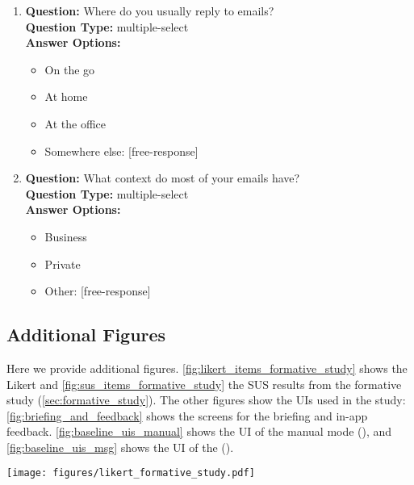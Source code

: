\begin{enumerate}
\item
  \textbf{Question:} Where do you usually reply to emails? \\
  \textbf{Question Type:} multiple-select \\
  \textbf{Answer Options:}
  \begin{itemize}
    \item On the go
    \item At home
    \item At the office
    \item Somewhere else: [free-response]
  \end{itemize}

\item
  \textbf{Question:} What context do most of your emails have? \\
  \textbf{Question Type:} multiple-select \\
  \textbf{Answer Options:}
  \begin{itemize}
    \item Business
    \item Private
    \item Other: [free-response]
  \end{itemize}

\end{enumerate}






\subsection{Additional Figures}\label{sec:appendix_extra_figures}
Here we provide additional figures.
\cref{fig:likert_items_formative_study} shows the Likert and \cref{fig:sus_items_formative_study} the SUS \cite{brooke1996sus} results from the formative study (\cref{sec:formative_study}).
The other figures show the UIs used in the study: \cref{fig:briefing_and_feedback} shows the screens for the briefing and in-app feedback. \cref{fig:baseline_uis_manual} shows the UI of the manual mode (\modemanual), and \cref{fig:baseline_uis_msg} shows the UI of the \modemailtxt{} (\modemail). 

\begin{figure*}[h!]
    \centering
    \texttt{[image: figures/likert\_formative\_study.pdf]}
    \caption{Likert results from the formative study (\cref{sec:formative_study}). The first three items were asked via an in-app feedback screen after each email, while the others were part of the final questionnaire at the end of the study.}
    \label{fig:likert_items_formative_study}
\end{figure*}


